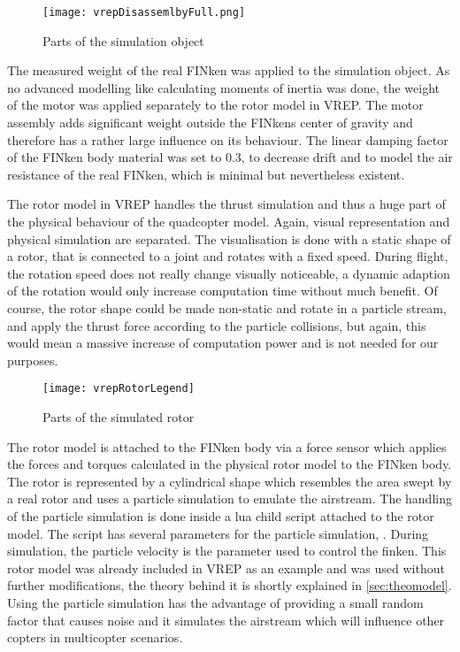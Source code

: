 \begin{figure}[h!]
 \begin{center}
  \texttt{[image: vrepDisassemlbyFull.png]}
 \end{center}
  \caption{Parts of the simulation object \label{fig:vrepParts}}
\end{figure}

The measured weight of the real FINken was applied to the simulation object. As no advanced modelling like calculating moments of inertia was done, the weight of the motor was applied separately to the rotor model in VREP.  The motor assembly adds significant weight outside the FINkens center of gravity and therefore has a rather large influence on its behaviour. 
The linear damping factor of the FINken body material was set to 0.3, to decrease drift and to model the air resistance of the real FINken, which is minimal but nevertheless existent.


The rotor model in VREP handles the thrust simulation and thus a huge part of the physical behaviour of the quadcopter model.  Again, visual representation and physical simulation are separated. 
The visualisation is done with a static shape of a rotor, that is connected to a joint and rotates with a fixed speed. During flight, the rotation speed does not really change visually noticeable, a dynamic adaption of the rotation would only increase computation time without much benefit. Of course, the rotor shape could be made non-static and rotate in a particle stream, and apply the thrust force according to the particle collisions, but again, this would mean a massive increase of computation power and is not needed for our purposes.

\begin{figure}[h!]
 \begin{center}
  \texttt{[image: vrepRotorLegend]}
 \end{center}
  \caption{Parts of the simulated rotor \label{fig:vrepRotor}}
\end{figure}


The rotor model is attached to the FINken body via a force sensor which applies the forces and torques calculated in the physical rotor model to the FINken body. The rotor is represented by a cylindrical shape which resembles the area swept by a real rotor and uses a particle simulation to emulate the airstream. The handling of the particle simulation is done inside a lua child script attached to the rotor model. The script has several parameters for the particle simulation, .
During simulation, the particle velocity is the parameter used to control the finken. This rotor model was already included in VREP as an example and was used without further modifications, the theory behind it is shortly explained in \ref{sec:theomodel}. Using the particle simulation has the advantage of providing a small random factor that causes noise and it simulates the airstream which will influence  other copters in multicopter scenarios.



